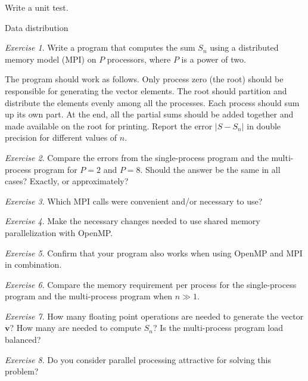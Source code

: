 \documentclass[onecolumn, oneside, a4paper, 11pt]{memoir}
\theoremstyle{remark}
\newtheorem{ex}{Exercise}
\begin{document}
Write a unit test.





Data distribution

\begin{ex}
  Write a program that computes the sum $S_n$ using a distributed memory model
  (MPI) on $P$ processors, where $P$ is a power of two.

  The program should work as follows. Only process zero (the root) should be
  responsible for generating the vector elements. The root should partition and
  distribute the elements evenly among all the processes. Each process should
  sum up its own part. At the end, all the partial sums should be added together
  and made available on the root for printing. Report the error $|S-S_n|$ in
  double precision for different values of $n$.
\end{ex}


\begin{ex}
  Compare the errors from the single-process program and the multi-process
  program for $P=2$ and $P=8$. Should the answer be the same in all cases?
  Exactly, or approximately?
\end{ex}

\begin{ex}
  Which MPI calls were convenient and/or necessary to use?
\end{ex}

\begin{ex}
  Make the necessary changes needed to use shared memory parallelization with
  OpenMP.
\end{ex}

\begin{ex}
  Confirm that your program also works when using OpenMP and MPI in
  combination.
\end{ex}


\begin{ex}
  Compare the memory requirement per process for the single-process program and
  the multi-process program when $n \gg 1$.
\end{ex}

\begin{ex}
  How many floating point operations are needed to generate the vector $\bm v$?
  How many are needed to compute $S_n$? Is the multi-process program load
  balanced?
\end{ex}

\begin{ex}
  Do you consider parallel processing attractive for solving this problem?
\end{ex}
\end{document}
